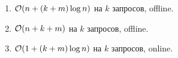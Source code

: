 \begin{enumerate}
    \begin{enumerate}
      \item $\mathcal{O}(n + (k + m)\log{n})$ на $k$ запросов, offline.
      \item $\mathcal{O}(n + k + m)$ на $k$ запросов, offline.
      \item {} $\mathcal{O}(1 + (k + m)\log{n})$ на $k$ запросов, online.
    \end{enumerate}



\end{enumerate}
